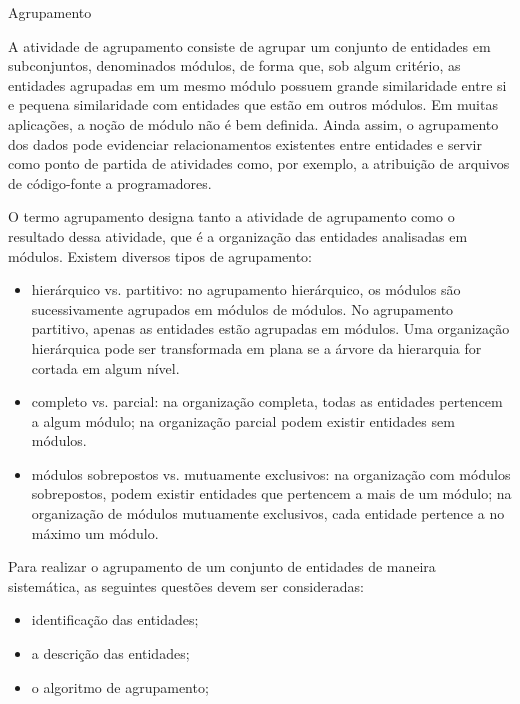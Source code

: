 \begin{section}{Agrupamento}

A atividade de agrupamento consiste de agrupar um conjunto de entidades em subconjuntos, denominados módulos, de forma que, sob algum critério, as entidades agrupadas em um mesmo módulo possuem grande similaridade entre si e pequena similaridade com entidades que estão em outros módulos. Em muitas aplicações, a noção de módulo não é bem definida. Ainda assim, o agrupamento dos dados pode evidenciar relacionamentos existentes entre entidades e servir como ponto de partida de atividades como, por exemplo, a atribuição de arquivos de código-fonte a programadores.

O termo agrupamento designa tanto a atividade de agrupamento como o resultado dessa atividade, que é a organização das entidades analisadas em módulos. Existem diversos tipos de agrupamento:

\begin{itemize}
	\item hierárquico vs. partitivo: no agrupamento hierárquico, os módulos são sucessivamente agrupados em módulos de módulos. No agrupamento partitivo, apenas as entidades estão agrupadas em módulos. Uma organização hierárquica pode ser transformada em plana se a árvore da hierarquia for cortada em algum nível.

	\item completo vs. parcial: na organização completa, todas as entidades pertencem a algum módulo; na organização parcial podem existir entidades sem módulos.

	\item módulos sobrepostos vs. mutuamente exclusivos: na organização com módulos sobrepostos, podem existir entidades que pertencem a mais de um módulo; na organização de módulos mutuamente exclusivos, cada entidade pertence a no máximo um módulo.
\end{itemize}


Para realizar o agrupamento de um conjunto de entidades de maneira sistemática, as seguintes questões devem ser consideradas:

\begin{itemize}
	\item identificação das entidades;
	\item a descrição das entidades;
	\item o algoritmo de agrupamento;
\end{itemize}


\end{section}
